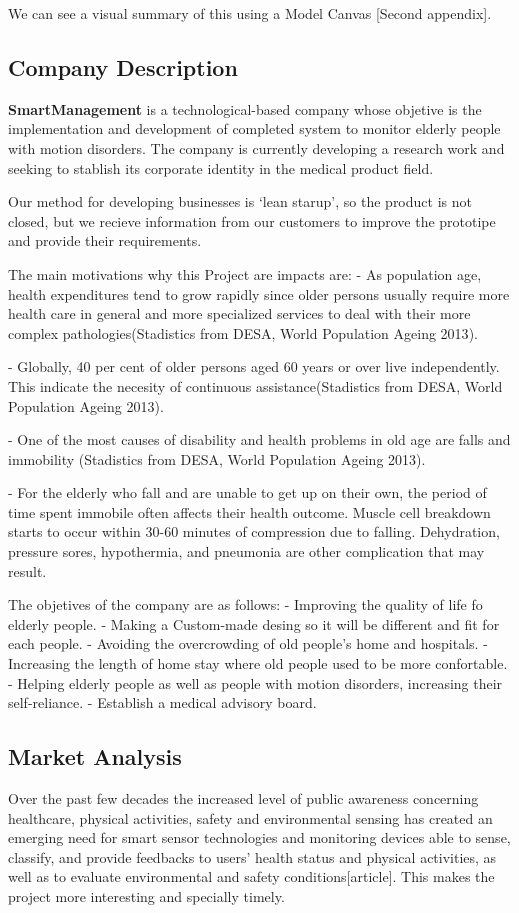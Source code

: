 We can see a visual summary of this using a Model Canvas [Second appendix].

\subsection{Company Description}
\textbf{SmartManagement} is a technological-based company whose objetive is the implementation and development of completed system to monitor elderly people with motion disorders. The company is currently developing a research work and seeking to stablish its corporate identity in the medical product field.

Our method for developing businesses is ‘lean starup’, so the product is not closed, but we recieve information from our customers to improve the prototipe and provide their requirements.

The main motivations why this Project are impacts are:
-	As population age, health expenditures tend to grow rapidly since older persons usually require more health care in general and more specialized services to deal with their more complex pathologies(Stadistics from DESA,  World Population Ageing 2013\cite{desa}).

-	Globally, 40 per cent of older persons aged 60 years or over live independently. This indicate the necesity of continuous assistance(Stadistics from DESA,  World Population Ageing 2013\cite{desa}).

-	One of the most causes of disability and health problems in old age are falls and immobility (Stadistics from DESA,  World Population Ageing 2013\cite{desa}).

-	For the elderly who fall and are unable to get up on their own, the period of time spent immobile often affects their health outcome. Muscle cell breakdown starts to occur within 30-60 minutes of compression due to falling. Dehydration, pressure sores, hypothermia, and pneumonia are other complication that may result\cite{A.Olivares2013}.

The objetives of the company are as follows:
-	Improving the quality of life fo elderly people.
-	Making a Custom-made desing so it will be different and fit for each people.
-	Avoiding the overcrowding of old people’s home and hospitals.
-	Increasing the length of home stay where old people used to be more confortable.
-	Helping elderly people as well as people with motion disorders, increasing their self-reliance.
-	Establish a medical advisory board.

\subsection{Market Analysis}
 Over the past few decades the increased level of public awareness concerning healthcare, physical activities, safety and environmental sensing has created an emerging need for smart sensor technologies and monitoring devices able to sense, classify, and provide feedbacks to users’ health status and physical activities, as well as to evaluate environmental and safety conditions[article]. This makes the project more interesting and specially timely.
 

